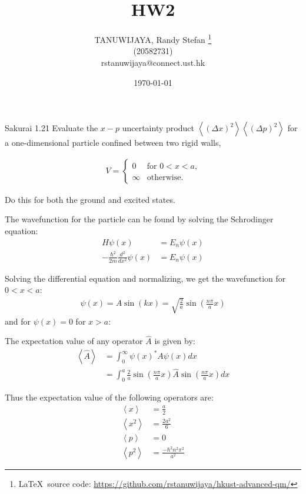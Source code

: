 \documentclass{article}
\title{HW2}
\author{TANUWIJAYA, Randy Stefan \footnote{\LaTeX\ source code: \url{https://github.com/rstanuwijaya/hkust-advanced-qm/}}
\\ (20582731) \\ rstanuwijaya@connect.ust.hk}
\affil{Department of Physics - HKUST}
\date{\today}
\begin{document}
\maketitle
\newcommand{\expc}[1]{\left<#1\right>}
\begin{section}{Sakurai 1.21}
\newcommand{\wf}{\sin \left( \frac{n \pi}{a} x \right)}
Evaluate the $x-p$ uncertainty product $\expc{(\Delta x)^2} \expc{(\Delta p)^2}$ for a one-dimensional particle confined between two rigid walls,

\begin{align*}
	V = \begin{cases}
		    0      & \text{for $0 < x < a$,} \\
		    \infty & \text{otherwise.}
	    \end{cases}
\end{align*}

Do this for both the ground and excited states.
\begin{tcolorbox}[breakable]
	The wavefunction for the particle can be found by solving the Schrodinger equation:
	\begin{align*}
		H \psi(x)                                     & = E_n \psi(x) \\
		- \frac{\hbar^2}{2m} \frac{d^2}{dx^2} \psi(x) & = E_n \psi(x)
	\end{align*}

	Solving the differential equation and normalizing, we get the wavefunction for $0 < x < a$:
	\begin{align*}
		\psi(x) = A \sin \left( k x \right) = \sqrt{\frac{2}{a}} \wf
	\end{align*}
	and for $\psi(x) = 0$ for $x > a$:

	The expectation value of any operator $\hat A$ is given by:
	\begin{align*}
		\expc{\hat A} & = \int_0^\infty \psi(x)^* A \psi(x) dx   \\
		              & = \int_0^a \frac{2}{a} \wf \hat A \wf dx
	\end{align*}

	Thus the expectation value of the following operators are:
	\begin{align*}
		\expc{x}   & = \frac{a}{2}                    \\
		\expc{x^2} & = \frac{2a^2}{6}                 \\
		\expc{p}   & = 0                              \\
		\expc{p^2} & = \frac{-\hbar^2 n^2 \pi^2}{a^2}
	\end{align*}


\end{tcolorbox}
\end{section}
\end{document}

